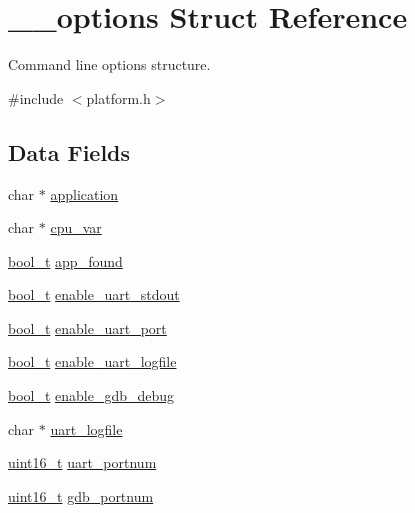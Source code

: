 \hypertarget{struct____options}{
\section{\_\-\_\-options Struct Reference}
\label{struct____options}
}


Command line options structure.  




{\ttfamily \#include $<$platform.h$>$}

\subsection*{Data Fields}
\begin{DoxyCompactItemize}
\item 
char $\ast$ \hyperlink{struct____options_a33c5b7a1a2460b52fd523966dd072eaa}{application}
\item 
char $\ast$ \hyperlink{struct____options_a149b98b6e5255adffe7c233f1041f10b}{cpu\_\-var}
\item 
\hyperlink{platform_8h_a449976458a084f880dc8e3d29e7eb6f5}{bool\_\-t} \hyperlink{struct____options_a733b31987044d50323e4f93e0afe9a8f}{app\_\-found}
\item 
\hyperlink{platform_8h_a449976458a084f880dc8e3d29e7eb6f5}{bool\_\-t} \hyperlink{struct____options_ab5b8b39189b95f1615c39675b79a73ad}{enable\_\-uart\_\-stdout}
\item 
\hyperlink{platform_8h_a449976458a084f880dc8e3d29e7eb6f5}{bool\_\-t} \hyperlink{struct____options_a15f7a21cd358306ec7dacdc31af63500}{enable\_\-uart\_\-port}
\item 
\hyperlink{platform_8h_a449976458a084f880dc8e3d29e7eb6f5}{bool\_\-t} \hyperlink{struct____options_a5e2e7cb01a0ffb14f7711bb1acfcaa35}{enable\_\-uart\_\-logfile}
\item 
\hyperlink{platform_8h_a449976458a084f880dc8e3d29e7eb6f5}{bool\_\-t} \hyperlink{struct____options_a3d67a28c9bac416b79b31ed083589bdd}{enable\_\-gdb\_\-debug}
\item 
char $\ast$ \hyperlink{struct____options_ac18c89a10926fd45241dc3ccf4150d1d}{uart\_\-logfile}
\item 
\hyperlink{platform_8h_adf4d876453337156dde61095e1f20223}{uint16\_\-t} \hyperlink{struct____options_a27bc7cd2c5dab1b6124ffe28df00f541}{uart\_\-portnum}
\item 
\hyperlink{platform_8h_adf4d876453337156dde61095e1f20223}{uint16\_\-t} \hyperlink{struct____options_ad1c40c592ac3d910f92b83bf088fa5ef}{gdb\_\-portnum}
\end{DoxyCompactItemize}


